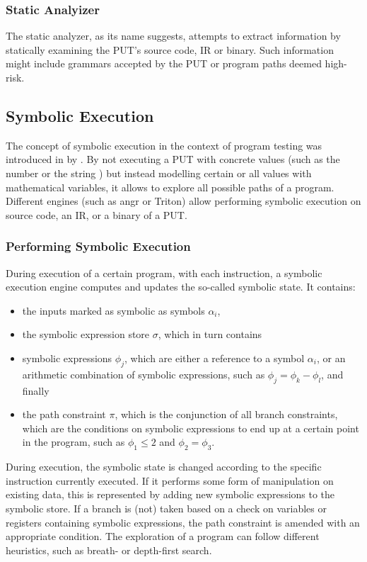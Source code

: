 \documentclass{article}
\begin{document}
\begin{multicols}{2}
    \subsubsection{Static Analyizer}
    The static analyzer, as its name suggests, attempts to extract information by statically examining the PUT's source code, IR or binary. Such information might include grammars accepted by the PUT or program paths deemed high-risk.

    \subsection{Symbolic Execution}
    The concept of symbolic execution in the context of program testing was introduced in \citeyear{Symbex} by \citeauthor{Symbex}.\cite{Symbex} By not executing a PUT with concrete values (such as the number  or the string ) but instead modelling certain or all values with mathematical variables, it allows to explore all possible paths of a program. Different engines (such as angr\cite{angr} or Triton\cite{Triton}) allow performing symbolic execution on source code, an IR, or a binary of a PUT.

    \subsubsection{Performing Symbolic Execution}
    During execution of a certain program, with each instruction, a symbolic execution engine computes and updates the so-called symbolic state. It contains:
    \begin{itemize}
        \item the inputs marked as symbolic as symbols $\alpha_i$,
        \item the symbolic expression store $\sigma$, which in turn contains
        \item symbolic expressions $\phi_j$, which are either a reference to a symbol $\alpha_i$, or an arithmetic combination of symbolic expressions, such as $\phi_j=\phi_k-\phi_l$, and finally
        \item the path constraint $\pi$, which is the conjunction of all branch constraints, which are the conditions on symbolic expressions to end up at a certain point in the program, such as $\phi_1\leq2$ and $\phi_2=\phi_3$.
    \end{itemize}

    During execution, the symbolic state is changed according to the specific instruction currently executed. If it performs some form of manipulation on existing data, this is represented by adding new symbolic expressions to the symbolic store. If a branch is (not) taken based on a check on variables or registers containing symbolic expressions, the path constraint is amended with an appropriate condition. The exploration of a program can follow different heuristics, such as breath- or depth-first search.


\end{multicols}
\end{document}
